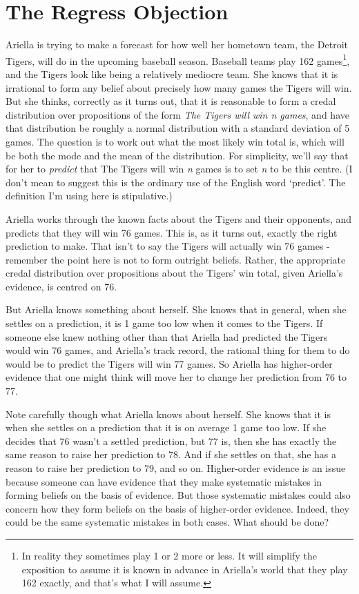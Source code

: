 \documentclass[
  10pt,
  letterpaper,
  twoside]{scrbook}
\begin{document}
\section{The Regress Objection}\label{theregressobjection}

{Ariella} is trying to make a forecast for how well her hometown team,
the Detroit Tigers, will do in the upcoming baseball season. Baseball
teams play 162 games\footnote{In reality they sometimes play 1 or 2 more
  or less. It will simplify the exposition to assume it is known in
  advance in Ariella's world that they play 162 exactly, and that's what
  I will assume.}, and the Tigers look like being a relatively mediocre
team. She knows that it is irrational to form any belief about precisely
how many games the Tigers will win. But she thinks, correctly as it
turns out, that it is reasonable to form a credal distribution over
propositions of the form \emph{The Tigers will win n games}, and have
that distribution be roughly a normal distribution with a standard
deviation of 5 games. The question is to work out what the most likely
win total is, which will be both the mode and the mean of the
distribution. For simplicity, we'll say that for her to \emph{predict}
that The Tigers will win \emph{n} games is to set \emph{n} to be this
centre. (I don't mean to suggest this is the ordinary use of the English
word `predict'. The definition I'm using here is stipulative.)

{Ariella} works through the known facts about the Tigers and their
opponents, and predicts that they will win 76 games. This is, as it
turns out, exactly the right prediction to make. That isn't to say the
Tigers will actually win 76 games - remember the point here is not to
form outright beliefs. Rather, the appropriate credal distribution over
propositions about the Tigers' win total, given {Ariella}'s evidence, is
centred on 76.

But {Ariella} knows something about herself. She knows that in general,
when she settles on a prediction, it is 1 game too low when it comes to
the Tigers. If someone else knew nothing other than that {Ariella} had
predicted the Tigers would win 76 games, and {Ariella}'s track record,
the rational thing for them to do would be to predict the Tigers will
win 77 games. So {Ariella} has higher-order evidence that one might
think will move her to change her prediction from 76 to 77.

Note carefully though what {Ariella} knows about herself. She knows that
it is when she settles on a prediction that it is on average 1 game too
low. If she decides that 76 wasn't a settled prediction, but 77 is, then
she has exactly the same reason to raise her prediction to 78. And if
she settles on that, she has a reason to raise her prediction to 79, and
so on. Higher-order evidence is an issue because someone can have
evidence that they make systematic mistakes in forming beliefs on the
basis of evidence. But those systematic mistakes could also concern how
they form beliefs on the basis of higher-order evidence. Indeed, they
could be the same systematic mistakes in both cases. What should be
done?
\end{document}
